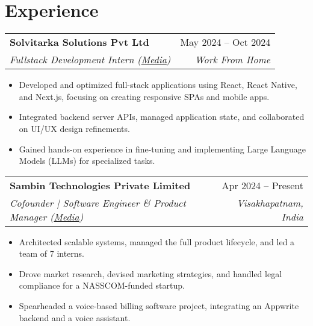 \documentclass[a4paper]{article}
\makeatletter
\newcommand{\resumeSubheading}[4]{
  \vspace{-1pt}\item
    \begin{tabular*}{\textwidth}{l@{\extracolsep{\fill}}r}
      \textbf{#1} & #2 \\
      \textit{\small#3} & \textit{\small #4} \\
    \end{tabular*}\vspace{-5pt}
}
\makeatother
\begin{document}
\section{Experience}
\begin{resumeSubHeadingList}
    \resumeSubheading
    {Solvitarka Solutions Pvt Ltd}{May 2024 -- Oct 2024}
    {Fullstack Development Intern (\href{https://sai.fhaida.com/\#experience-2}{Media})}{Work From Home}
    \begin{itemize}[label={\small$\bullet$}, itemsep=-2pt]
        \item Developed and optimized full-stack applications using React, React Native, and Next.js, focusing on creating responsive SPAs and mobile apps.
        \item Integrated backend server APIs, managed application state, and collaborated on UI/UX design refinements.
        \item Gained hands-on experience in fine-tuning and implementing Large Language Models (LLMs) for specialized tasks.
    \end{itemize}

    \resumeSubheading
    {Sambin Technologies Private Limited}{Apr 2024 -- Present}
    {Cofounder | Software Engineer \& Product Manager (\href{https://sai.fhaida.com/\#experience-1}{Media})}{Visakhapatnam, India}
    \begin{itemize}[label={\small$\bullet$}, itemsep=-2pt]
        \item Architected scalable systems, managed the full product lifecycle, and led a team of 7 interns.
        \item Drove market research, devised marketing strategies, and handled legal compliance for a NASSCOM-funded startup.
        \item Spearheaded a voice-based billing software project, integrating an Appwrite backend and a voice assistant.
    \end{itemize}
\end{resumeSubHeadingList}

\end{document}
